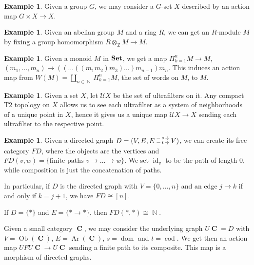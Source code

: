 \documentclass[a4paper,11pt,twoside, openany]{book}
\newcommand{\catname}[1]{{\normalfont\textbf{#1}}}
\newcommand{\Set}{\catname{Set}}
\DeclareMathOperator{\C}{\mathbf{C}}
\DeclareMathOperator{\N}{\mathbb{N}}
\DeclareMathOperator{\Z}{\mathbb{Z}}
\DeclareMathOperator{\id}{id}
\DeclareMathOperator{\dom}{dom}
\DeclareMathOperator{\cod}{cod}
\DeclareMathOperator{\Ob}{Ob}
\DeclareMathOperator{\Ar}{Ar}
\theoremstyle{definition}
\theoremstyle{definition}
\newtheorem{exmp}[thm]{Example} %
\theoremstyle{remark}
\begin{document}
	\begin{exmp}
		Given a group $G$, we may consider a $G$-set $X$ described by an action map $G\times X\rightarrow X$.
	\end{exmp}
	\begin{exmp}
		Given an abelian group $M$ and a ring $R$, we can get an $R$-module $M$ by fixing a group homomorphism $R\otimes_{\Z} M\rightarrow M$.
	\end{exmp}
	\begin{exmp}
		Given a monoid $M$ in $\Set$, we get a map $\Pi_{k=1}^n M\rightarrow M$, $(m_1,\ldots,m_n)\mapsto ((\ldots ((m_1m_2)m_3)\ldots )m_{n-1}) m_n$. This induces an action map from $W(M)=\amalg_{n\in\N}\Pi_{k=1}^n M$, the set of words on $M$, to $M$.
	\end{exmp}
	\begin{exmp}\label{ultrafilters}
		Given a set $X$, let $\mathcal{U}X$ be the set of ultrafilters on it. Any compact T2 topology on $X$ allows us to see each ultrafilter as a system of neighborhoods of a unique point in $X$, hence it gives us a unique map $\mathcal{U}X\rightarrow X$ sending each ultrafilter to the respective point.
	\end{exmp}
	\begin{exmp}
		Given a directed graph $D=(V,E,\hspace{-1.5mm}\begin{tikzcd}
		E\hspace{-1.5mm}\arrow[r, "t" description,  shift right=.5ex, shorten <= .3em, shorten >= .3em]  \arrow[r, "s" description, shift left=1ex, shorten <= .3em, shorten >= .3em] & \hspace{-1.5mm}V
		\end{tikzcd}\hspace{-1.5mm})$, we can create its free category $FD$, where the objects are the vertices and $FD(v,w)=\{\text{finite paths } v\rightarrow\ldots\rightarrow w\}$. We set $\id_v$ to be the path of length 0, while composition is just the concatenation of paths.
		
		In particular, if $D$ is the directed graph with $V=\{0,\ldots,n\}$ and an edge $j\rightarrow k$ if and only if $k=j+1$, we have $FD\cong [n]$.
		
		If $D=\{*\}$ and $E=\{*\rightarrow *\}$, then $FD(*,*)\cong\N$.
		
		Given a small category $\C$, we may consider the underlying graph $U\C=D$ with $V=\Ob(\C)$, $E=\Ar(\C)$, $s=\dom$ and $t=\cod$. We get then an action map $UFU\C\rightarrow U\C$ sending a finite path to its composite. This map is a morphism of directed graphs.
	\end{exmp}
	
\end{document}
